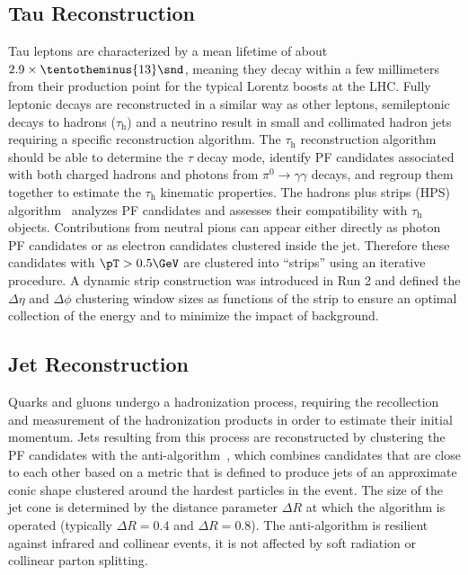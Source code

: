 \subsection{Tau Reconstruction}
\label{sec:tau_reco}
Tau leptons are characterized by a mean lifetime of about $2.9 \times \tentotheminus{13}\snd$, meaning they decay within a few millimeters from their production point for the typical Lorentz boosts at the LHC.
Fully leptonic decays are reconstructed in a similar way as other leptons, semileptonic decays to hadrons ($\tau_\text{h}$) and a neutrino result in small and collimated hadron jets requiring a specific reconstruction algorithm.
The $\tau_\text{h}$ reconstruction algorithm should be able to determine the $\tau$ decay mode, identify PF candidates associated with both charged hadrons and photons from $\pi^0 \rightarrow \gamma\gamma$ decays, and regroup them together to estimate the $\tau_\text{h}$ kinematic properties.
The hadrons plus strips (HPS) algorithm~\cite{CMS:2011eio,CMS:2015pac} analyzes PF candidates and assesses their compatibility with $\tau_\text{h}$ objects.
Contributions from neutral pions can appear either directly as photon PF candidates or as electron candidates clustered inside the jet.
Therefore these candidates with $\pT > 0.5\GeV$ are clustered into ``strips'' using an iterative procedure.
A dynamic strip construction was introduced in Run 2 and defined the $\Delta\eta$ and $\Delta\phi$ clustering window sizes as functions of the strip \pT to ensure an optimal collection of the energy and to minimize the impact of background.

\subsection{Jet Reconstruction}
\label{sec:jet_reco}
Quarks and gluons undergo a hadronization process, requiring the recollection and measurement of the hadronization products in order to estimate their initial momentum.
Jets resulting from this process are reconstructed by clustering the PF candidates with the anti-\kt algorithm~\cite{Cacciari:2008gp, Cacciari:2011ma}, which combines candidates that are close to each other based on a metric that is defined to produce jets of an approximate conic shape clustered around the hardest particles in the event.
The size of the jet cone is determined by the distance parameter $\Delta R$ at which the algorithm is operated (typically $\Delta R = 0.4$ and $ \Delta R = 0.8$).
The anti-\kt algorithm is resilient against infrared and collinear events, \ie it is not affected by soft radiation or collinear parton splitting. 

